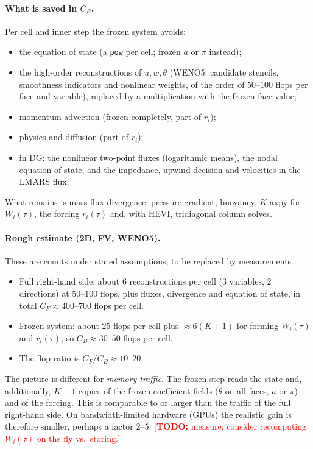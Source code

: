 \documentclass[11pt,a4paper]{article}
\theoremstyle{definition}
\theoremstyle{remark}
\newcommand{\todo}[1]{\textcolor{red}{[\textbf{TODO:} #1]}}
\begin{document}
\paragraph{What is saved in $C_B$.}
Per cell and inner step the frozen system avoids:
\begin{itemize}
\item the equation of state (a \texttt{pow} per cell; frozen $a$ or $\pi$
  instead);
\item the high-order reconstructions of $u,w,\theta$ (WENO5: candidate
  stencils, smoothness indicators and nonlinear weights, of the order of
  $50$--$100$ flops per face and variable), replaced by a multiplication
  with the frozen face value;
\item momentum advection (frozen completely, part of $r_i$);
\item physics and diffusion (part of $r_i$);
\item in DG: the nonlinear two-point fluxes (logarithmic means), the
  nodal equation of state, and the impedance, upwind decision and
  velocities in the LMARS flux.
\end{itemize}
What remains is mass flux divergence, pressure gradient, buoyancy,
$K$ axpy for $W_i(\tau)$, the forcing $r_i(\tau)$ and, with HEVI,
tridiagonal column solves.

\paragraph{Rough estimate (2D, FV, WENO5).}
These are counts under stated assumptions, to be replaced by
measurements.
\begin{itemize}
\item Full right-hand side: about 6 reconstructions per cell (3
  variables, 2 directions) at 50--100 flops, plus fluxes, divergence and
  equation of state, in total $C_F\approx400$--$700$ flops per cell.
\item Frozen system: about $25$ flops per cell plus $\approx6(K+1)$ for
  forming $W_i(\tau)$ and $r_i(\tau)$, so $C_B\approx30$--$50$ flops per
  cell.
\item The flop ratio is $C_F/C_B\approx10$--$20$.
\end{itemize}
The picture is different for \emph{memory traffic}. The frozen step
reads the state and, additionally, $K+1$ copies of the frozen
coefficient fields ($\hat\theta$ on all faces, $a$ or $\pi$) and of the
forcing. This is comparable to or larger than the traffic of the full
right-hand side. On bandwidth-limited hardware (GPUs) the realistic gain
is therefore smaller, perhaps a factor $2$--$5$.
\todo{measure; consider recomputing $W_i(\tau)$ on the fly vs.\ storing.}
\end{document}
